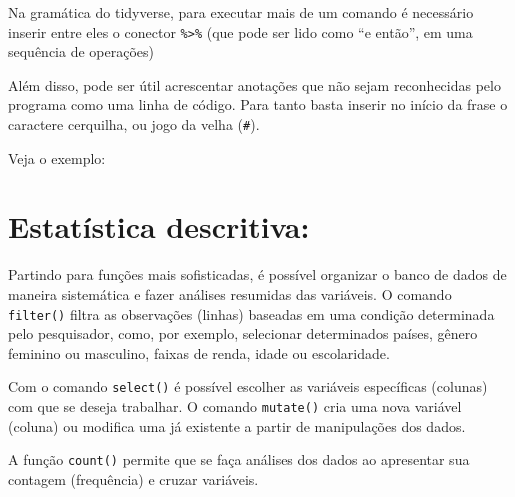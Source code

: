 \documentclass[
  10pt,
  brazil,
  a4paper,
  twoside, notitlepage, openright]{book}
\newenvironment{Shaded}{\begin{snugshade}}{\end{snugshade}}
\newcommand{\CommentTok}[1]{\textcolor[rgb]{0.56,0.35,0.01}{\textit{#1}}}
\newcommand{\DataTypeTok}[1]{\textcolor[rgb]{0.13,0.29,0.53}{#1}}
\newcommand{\KeywordTok}[1]{\textcolor[rgb]{0.13,0.29,0.53}{\textbf{#1}}}
\newcommand{\NormalTok}[1]{#1}
\newcommand{\OperatorTok}[1]{\textcolor[rgb]{0.81,0.36,0.00}{\textbf{#1}}}
\newcommand{\OtherTok}[1]{\textcolor[rgb]{0.56,0.35,0.01}{#1}}
\newcommand{\StringTok}[1]{\textcolor[rgb]{0.31,0.60,0.02}{#1}}
\begin{document}
Na gramática do tidyverse, para executar mais de um comando é necessário inserir entre eles o conector \texttt{\%\textgreater{}\%} (que pode ser lido como ``e então'', em uma sequência de operações)

Além disso, pode ser útil acrescentar anotações que não sejam reconhecidas pelo programa como uma linha de código. Para tanto basta inserir no início da frase o caractere cerquilha, ou jogo da velha (\texttt{\#}).

Veja o exemplo:

\begin{Shaded}
\end{Shaded}

\hypertarget{estatuxedstica-descritiva}{%
\section{Estatística descritiva:}\label{estatuxedstica-descritiva}}

Partindo para funções mais sofisticadas, é possível organizar o banco de dados de maneira sistemática e fazer análises resumidas das variáveis. O comando \texttt{filter()} filtra as observações (linhas) baseadas em uma condição determinada pelo pesquisador, como, por exemplo, selecionar determinados países, gênero feminino ou masculino, faixas de renda, idade ou escolaridade.

Com o comando \texttt{select()} é possível escolher as variáveis específicas (colunas) com que se deseja trabalhar. O comando \texttt{mutate()} cria uma nova variável (coluna) ou modifica uma já existente a partir de manipulações dos dados.

A função \texttt{count()} permite que se faça análises dos dados ao apresentar sua contagem (frequência) e cruzar variáveis.
\end{document}

